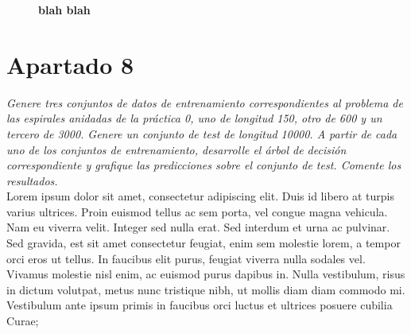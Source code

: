 \documentclass[a4paper, 11pt]{article} %
\begin{document}
\begin{figure}
  \centering
  \caption*{\textbf{blah blah}}

\end{figure}


\section*{Apartado 8}  \textit{Genere tres conjuntos de datos de entrenamiento
correspondientes al problema de las espirales anidadas de la práctica 0, uno de
longitud 150, otro de 600 y un tercero de 3000. Genere un conjunto de test de
longitud 10000. A partir de cada uno de los conjuntos de entrenamiento,
desarrolle el árbol de decisión correspondiente y grafique las predicciones
sobre el conjunto de test. Comente los resultados.}\\

Lorem ipsum dolor sit amet, consectetur adipiscing elit. Duis id libero at
turpis varius ultrices. Proin euismod tellus ac sem porta, vel congue magna
vehicula. Nam eu viverra velit. Integer sed nulla erat. Sed interdum et urna ac
pulvinar. Sed gravida, est sit amet consectetur feugiat, enim sem molestie
lorem, a tempor orci eros ut tellus. In faucibus elit purus, feugiat viverra
nulla sodales vel. Vivamus molestie nisl enim, ac euismod purus dapibus in.
Nulla vestibulum, risus in dictum volutpat, metus nunc tristique nibh, ut
mollis diam diam commodo mi. Vestibulum ante ipsum primis in faucibus orci
luctus et ultrices posuere cubilia Curae; 
\end{document}
